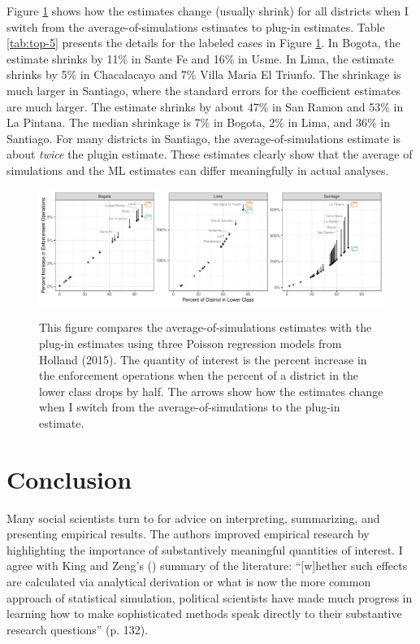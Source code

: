 \documentclass[12pt]{article}
\begin{document}
Figure \ref{fig:holland} shows how the estimates change (usually shrink) for all districts when I switch from the average-of-simulations estimates to plug-in estimates. Table \ref{tab:top-5} presents the details for the labeled cases in Figure \ref{fig:holland}. In Bogota, the estimate shrinks by 11\% in Sante Fe and 16\% in Usme. In Lima, the estimate shrinks by 5\% in Chacalacayo and 7\% Villa Maria El Triunfo. The shrinkage is much larger in Santiago, where the standard errors for the coefficient estimates are much larger. The estimate shrinks by about 47\% in San Ramon and 53\% in La Pintana. The median shrinkage is 7\% in Bogota, 2\% in Lima, and 36\% in Santiago. For many districts in Santiago, the average-of-simulations estimate is about \textit{twice} the plugin estimate. These estimates clearly show that the average of simulations and the ML estimates can differ meaningfully in actual analyses.

\begin{figure}[h]
\begin{center}
\includegraphics[width=\textwidth]{figs/holland.pdf}\\
\vspace{.1in}
\caption{This figure compares the average-of-simulations estimates with the plug-in estimates using three Poisson regression models from Holland (2015). The quantity of interest is the percent increase in the enforcement operations when the percent of a district in the lower class drops by half. The arrows show how the estimates change when I switch from the average-of-simulations to the plug-in estimate.}\label{fig:holland}
\end{center}
\end{figure}



\section*{Conclusion}

Many social scientists turn to \cite{KingTomzWittenberg2000} for advice on interpreting, summarizing, and presenting empirical results. The authors improved empirical research by highlighting the importance of substantively meaningful quantities of interest. I agree with King and Zeng's (\citeyear{king2006dangers}) summary of the literature: “[w]hether such effects are calculated via analytical derivation or what is now the more common approach of statistical simulation, political scientists have made much progress in learning how to make sophisticated methods speak directly to their substantive research questions” (p. 132). 
\end{document}
